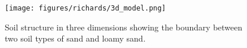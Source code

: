 \begin{figure}[!htbp]
\begin{center}
\texttt{[image: figures/richards/3d\_model.png]}
\end{center}
\caption{
Soil structure in three dimensions showing the boundary between two soil types of sand and loamy sand.
}
\label{fig:richards-3d_model}
\end{figure}

